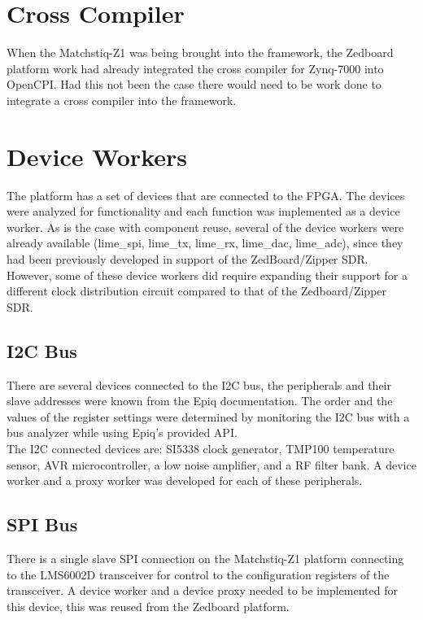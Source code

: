 \section{Cross Compiler}

When the Matchstiq-Z1 was being brought into the framework, the Zedboard platform work had already integrated the cross compiler for Zynq-7000 into OpenCPI.  Had this not been the case there would need to be work done to integrate a cross compiler into the framework.

\section{Device Workers}
The platform has a set of devices that are connected to the FPGA.  The devices were analyzed for functionality and each function was implemented as a device worker. As is the case with component reuse, several of the device workers were already available (lime\_spi, lime\_tx, lime\_rx, lime\_dac, lime\_adc), since they had been previously developed in support of the ZedBoard/Zipper SDR. However, some of these device workers did require expanding their support for a different clock distribution circuit compared to that of the Zedboard/Zipper SDR.

  \subsection{I2C Bus}
  There are several devices connected to the I2C bus, the peripherals and their slave addresses were known from the Epiq documentation.  The order and the values of the register settings were determined by monitoring the I2C bus with a bus analyzer while using Epiq's provided API.\\

\noindent The I2C connected devices are: SI5338 clock generator, TMP100 temperature sensor, AVR microcontroller, a low noise amplifier, and a RF filter bank.  A device worker and a  proxy worker was developed for each of these peripherals.

  \subsection{SPI Bus}
    There is a single slave SPI connection on the Matchstiq-Z1 platform connecting to the LMS6002D transceiver for control to the configuration registers of the transceiver.  A device worker and a device proxy needed to be implemented for this device, this was reused from the Zedboard platform.

